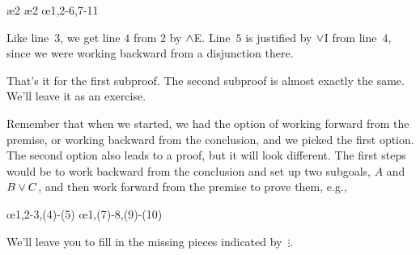\begin{fitchproof}
	\open
	\ae{2}
	\ae{2}
	\close
	\open
	\ellipsesline
	\close
	\oe{1,2-6,7-11}
\end{fitchproof}
Like line~$3$, we get line $4$ from $2$ by $\wedge$E. Line~$5$ is justified by $\vee$I from line~$4$, since we were working backward from a disjunction there.

That's it for the first subproof. The second subproof is almost exactly the same. We'll leave it as an exercise.

Remember that when we started, we had the option of working forward from the premise, or working backward from the conclusion, and we picked the first option. The second option also leads to a proof, but it will look different.  The first steps would be to work backward from the conclusion and set up two subgoals, $A$ and $B \vee C$, and then work forward from the premise to prove them, e.g.,
\begin{fitchproof}
	\open
	\ellipsesline
	\close
	\open
	\ellipsesline
	\close
	\oe{1,2-3,(4)-(5)}
	\open
	\ellipsesline
	\close
	\open
	\ellipsesline
	\close
	\oe{1,(7)-8,(9)-(10)}	
\end{fitchproof}
We'll leave you to fill in the missing pieces indicated by~$\vdots$.

